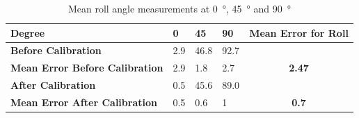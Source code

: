 ﻿\documentclass[12pt]{article}
\begin{document}
\begin{table}[!h]
\centering
\caption{Mean roll angle measurements at \SI{0}{\degree}, \SI{45}{\degree} and \SI{90}{\degree}}
\label{Table_acc_roll}
\begin{tabular}{lllll}
\hline
\textbf{Degree}                                                                                                                                                                                                             & \textbf{0} & \textbf{45} & \textbf{90} & \textbf{Mean Error for Roll}
\\ \hline
\textbf{Before Calibration}                                                                                                                                                                                                         & 2.9 & 46.8 & 92.7
\\ \hline
\textbf{Mean Error Before Calibration}                                                                                                                                                                                                             & 2.9 & 1.8 & 2.7 & \multicolumn{1}{c}{\textbf{2.47}}
\\ \hline
\textbf{After	 Calibration}                                                                                                                                                                                                              & 0.5 & 45.6 & 89.0
\\ \hline
\textbf{Mean Error After Calibration}                                                                                                                                                                                                             & 0.5 & 0.6 & 1 & \multicolumn{1}{c}{\textbf{0.7}}
\\ \hline
\end{tabular}
\end{table}
\end{document}

